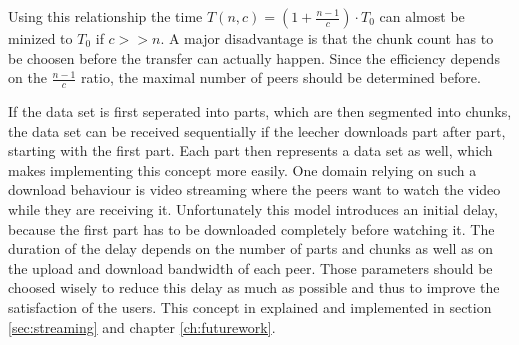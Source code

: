 Using this relationship the time $T(n, c) = (1 + \frac{n-1}{c}) \cdot T_0$ can almost be minized to $T_0$ if $c >> n$. A major disadvantage is that the chunk count has to be choosen before the transfer can actually happen. Since the efficiency depends on the $\frac{n-1}{c}$ ratio, the maximal number of peers should be determined before. 

If the data set is first seperated into parts, which are then segmented into chunks, the data set can be received sequentially if the leecher downloads part after part, starting with the first part. Each part then represents a data set as well, which makes implementing this concept more easily. One domain relying on such a download behaviour is video streaming where the peers want to watch the video while they are receiving it. Unfortunately this model introduces an initial delay, because the first part has to be downloaded completely before watching it. The duration of the delay depends on the number of parts and chunks as well as on the upload and download bandwidth of each peer. Those parameters should be choosed wisely to reduce this delay as much as possible and thus to improve the satisfaction of the users. This concept in explained and implemented in section \ref{sec:streaming} and chapter \ref{ch:futurework}.

